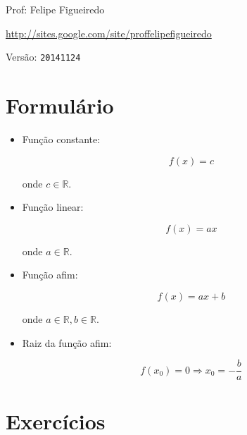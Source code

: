 \documentclass[a4paper]{article}
\begin{document}
\parbox[c]{.825\textwidth}{\raggedright%
{Prof: Felipe Figueiredo\par}
{\url{http://sites.google.com/site/proffelipefigueiredo}}
}

Versão: \verb|20141124|




\section{Formulário}

\begin{itemize}
\item Função constante:

\begin{displaymath}
  f(x) = c
\end{displaymath}

onde $c \in \mathbb{R}$.

\item Função linear:

\begin{displaymath}
  f(x) = ax
\end{displaymath}

onde $a \in \mathbb{R}$.

\item Função afim:

\begin{displaymath}
  f(x) = ax +b
\end{displaymath}

onde $a \in \mathbb{R}, b \in \mathbb{R}$.

\item Raiz da função afim:

\begin{displaymath}
 f(x_0) = 0 \Rightarrow  x_0 = -\frac{b}{a}
\end{displaymath}

\end{itemize}


\section{Exercícios}
\end{document}
